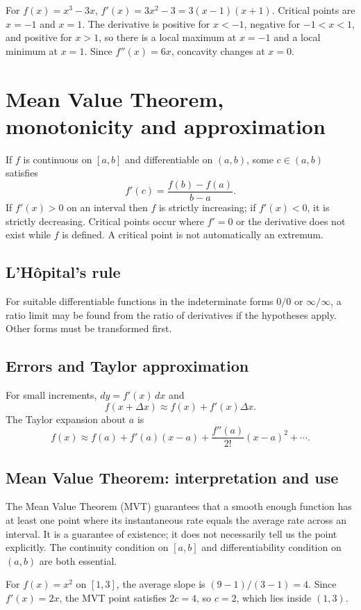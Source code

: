 \documentclass[12pt,a4paper]{article}
\begin{document}
\begin{exampleBox}For $f(x)=x^3-3x$, $f'(x)=3x^2-3=3(x-1)(x+1)$. Critical points are $x=-1$ and $x=1$. The derivative is positive for $x<-1$, negative for $-1<x<1$, and positive for $x>1$, so there is a local maximum at $x=-1$ and a local minimum at $x=1$. Since $f''(x)=6x$, concavity changes at $x=0$.
\end{exampleBox}

\section{Mean Value Theorem, monotonicity and approximation}
If $f$ is continuous on $[a,b]$ and differentiable on $(a,b)$, some $c\in(a,b)$ satisfies
\[
f'(c)=\frac{f(b)-f(a)}{b-a}.
\]
If $f'(x)>0$ on an interval then $f$ is strictly increasing; if $f'(x)<0$, it is strictly decreasing. Critical points occur where $f'=0$ or the derivative does not exist while $f$ is defined. A critical point is not automatically an extremum.
\subsection{L'H\^opital's rule}
For suitable differentiable functions in the indeterminate forms $0/0$ or $\infty/\infty$, a ratio limit may be found from the ratio of derivatives if the hypotheses apply. Other forms must be transformed first.
\subsection{Errors and Taylor approximation}
For small increments, $dy=f'(x)\,dx$ and
\[
f(x+\Delta x)\approx f(x)+f'(x)\Delta x.
\]
The Taylor expansion about $a$ is
\[
f(x)\approx f(a)+f'(a)(x-a)+\frac{f''(a)}{2!}(x-a)^2+\cdots.
\]
\subsection{Mean Value Theorem: interpretation and use}
The Mean Value Theorem (MVT) guarantees that a smooth enough function has at least one point where its instantaneous rate equals the average rate across an interval. It is a guarantee of existence; it does not necessarily tell us the point explicitly. The continuity condition on $[a,b]$ and differentiability condition on $(a,b)$ are both essential.

\begin{exampleBox}For $f(x)=x^2$ on $[1,3]$, the average slope is $(9-1)/(3-1)=4$. Since $f'(x)=2x$, the MVT point satisfies $2c=4$, so $c=2$, which lies inside $(1,3)$.
\end{exampleBox}
\end{document}
